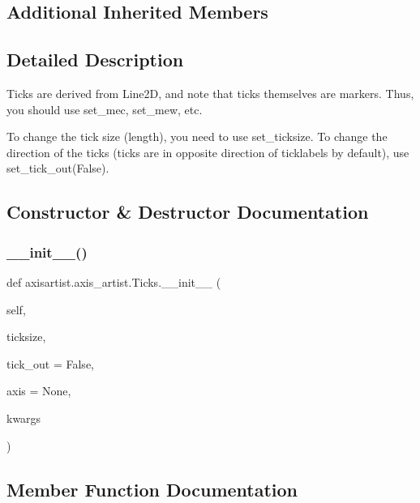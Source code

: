 \subsection*{Additional Inherited Members}


\subsection{Detailed Description}
\begin{DoxyVerb}Ticks are derived from Line2D, and note that ticks themselves
are markers. Thus, you should use set_mec, set_mew, etc.

To change the tick size (length), you need to use
set_ticksize. To change the direction of the ticks (ticks are
in opposite direction of ticklabels by default), use
set_tick_out(False).
\end{DoxyVerb}
 

\subsection{Constructor \& Destructor Documentation}
\mbox{\label{classaxisartist_1_1axis__artist_1_1Ticks_aa7739a17139cca6850737018cd2a71c1}} 
\subsubsection{\texorpdfstring{\+\_\+\+\_\+init\+\_\+\+\_\+()}{\_\_init\_\_()}}
{\footnotesize\ttfamily def axisartist.\+axis\+\_\+artist.\+Ticks.\+\_\+\+\_\+init\+\_\+\+\_\+ (\begin{DoxyParamCaption}\item[{}]{self,  }\item[{}]{ticksize,  }\item[{}]{tick\+\_\+out = {\ttfamily False},  }\item[{}]{axis = {\ttfamily None},  }\item[{}]{kwargs }\end{DoxyParamCaption})}



\subsection{Member Function Documentation}
\mbox{\label{classaxisartist_1_1axis__artist_1_1Ticks_a10650ae1ff3f41154841ed69f6b26cf3}} 
